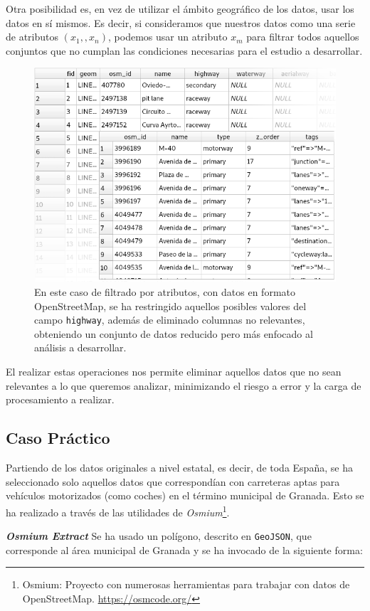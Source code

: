 	Otra posibilidad es, en vez de utilizar el ámbito geográfico de los datos, usar los datos en sí mismos. Es decir, si consideramos que nuestros datos como una serie de atributos $(x_1, , x_n)$, podemos usar un atributo $x_m$ para filtrar todos aquellos conjuntos que no cumplan las condiciones necesarias para el estudio a desarrollar.
	
	\begin{figure}[htbp]
		\centering
		\includegraphics[width=.6\textwidth]{img/data_filtering.png}
		\caption[Filtrado por atributos específicos]{En este caso de filtrado por atributos, con datos en formato OpenStreetMap, se ha restringido aquellos posibles valores del campo \texttt{highway}, además de eliminado columnas no relevantes, obteniendo un conjunto de datos reducido pero más enfocado al análisis a desarrollar.}
	\end{figure}

	El realizar estas operaciones nos permite eliminar aquellos datos que no sean relevantes a lo que queremos analizar, minimizando el riesgo a error y la carga de procesamiento a realizar.

	\subsection*{Caso Práctico}
	Partiendo de los datos originales a nivel estatal, es decir, de toda España, se ha seleccionado solo aquellos datos que correspondían con carreteras aptas para vehículos motorizados (como coches) en el término municipal de Granada.
	Esto se ha realizado a través de las utilidades de \textit{Osmium}\footnote{Osmium: Proyecto con numerosas herramientas para trabajar con datos de OpenStreetMap. \url{https://osmcode.org/}}.
	
	\begin{minipage}{\textwidth}
	\textbf{\textit{Osmium Extract}} Se ha usado un polígono, descrito en \texttt{GeoJSON}, que corresponde al área municipal de Granada \autocite{GranadaPoly} y se ha invocado de la siguiente forma:
	
\end{minipage}

